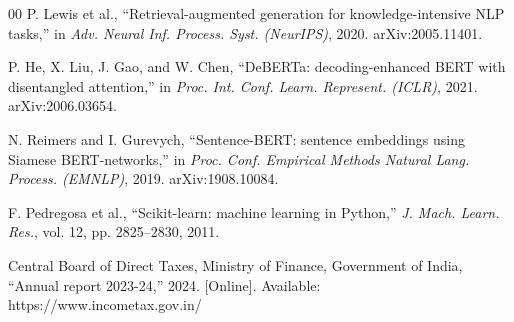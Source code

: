 \documentclass[conference]{IEEEtran}
\begin{document}
\begin{thebibliography}{00}
P. Lewis et al., ``Retrieval-augmented generation for knowledge-intensive NLP
tasks,'' in \emph{Adv. Neural Inf. Process. Syst. (NeurIPS)}, 2020.
arXiv:2005.11401.

P. He, X. Liu, J. Gao, and W. Chen, ``DeBERTa: decoding-enhanced BERT with
disentangled attention,'' in \emph{Proc. Int. Conf. Learn. Represent. (ICLR)},
2021. arXiv:2006.03654.

N. Reimers and I. Gurevych, ``Sentence-BERT: sentence embeddings using Siamese
BERT-networks,'' in \emph{Proc. Conf. Empirical Methods Natural Lang. Process.
(EMNLP)}, 2019. arXiv:1908.10084.

F. Pedregosa et al., ``Scikit-learn: machine learning in Python,'' \emph{J. Mach.
Learn. Res.}, vol. 12, pp. 2825--2830, 2011.

Central Board of Direct Taxes, Ministry of Finance, Government of India,
``Annual report 2023-24,'' 2024. [Online]. Available:
https://www.incometax.gov.in/
\end{thebibliography}
\end{document}
